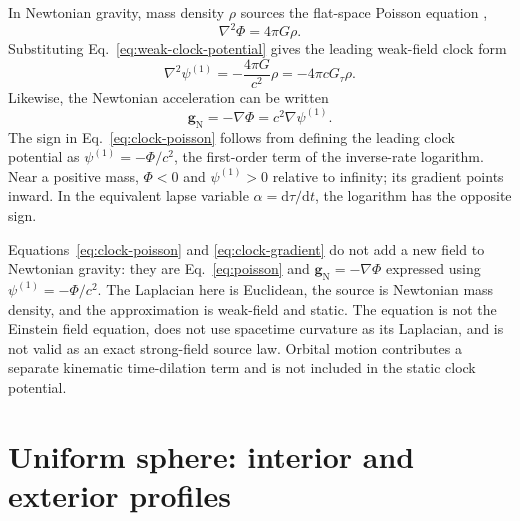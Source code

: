 \documentclass[12pt]{article}
\begin{document}
In Newtonian gravity, mass density $\rho$ sources the flat-space Poisson equation \cite{Poisson1813},
\begin{equation}
  \nabla^2\Phi=4\pi G\rho.
  \label{eq:poisson}
\end{equation}
Substituting Eq.~\eqref{eq:weak-clock-potential} gives the leading weak-field clock form
\begin{equation}
  \boxed{\nabla^2\psi^{(1)}
  =-\frac{4\pi G}{c^2}\rho
  =-4\pi cG_{\tau}\rho.}
  \label{eq:clock-poisson}
\end{equation}
Likewise, the Newtonian acceleration can be written
\begin{equation}
  \boxed{\mathbf{g}_{\mathrm{N}}
  =-\nabla\Phi=c^2\nabla\psi^{(1)}.}
  \label{eq:clock-gradient}
\end{equation}
The sign in Eq.~\eqref{eq:clock-poisson} follows from defining the leading clock potential as $\psi^{(1)}=-\Phi/c^2$, the first-order term of the inverse-rate logarithm. Near a positive mass, $\Phi<0$ and $\psi^{(1)}>0$ relative to infinity; its gradient points inward. In the equivalent lapse variable $\alpha=\mathrm{d}\tau/\mathrm{d}t$, the logarithm has the opposite sign.

Equations~\eqref{eq:clock-poisson} and \eqref{eq:clock-gradient} do not add a new field to Newtonian gravity: they are Eq.~\eqref{eq:poisson} and $\mathbf{g}_{\mathrm{N}}=-\nabla\Phi$ expressed using $\psi^{(1)}=-\Phi/c^2$. The Laplacian here is Euclidean, the source is Newtonian mass density, and the approximation is weak-field and static. The equation is not the Einstein field equation, does not use spacetime curvature as its Laplacian, and is not valid as an exact strong-field source law. Orbital motion contributes a separate kinematic time-dilation term and is not included in the static clock potential.

\section{Uniform sphere: interior and exterior profiles}
\end{document}
